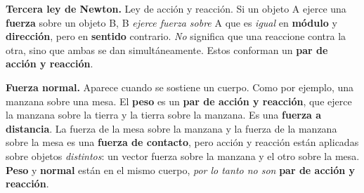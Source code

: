 \documentclass{article}
\begin{document}
\textbf{Tercera ley de Newton.} Ley de acción y reacción. Si un objeto A ejerce 
una \textbf{fuerza} sobre un objeto B, B \textit{ejerce fuerza sobre} A que es 
\textit{igual} en \textbf{módulo} y \textbf{dirección}, pero en \textbf{sentido}
contrario. \textit{No} significa que una reaccione contra la otra, sino que
ambas se dan simultáneamente. 
Estos conforman un \textbf{par de acción y reacción}.

\textbf{Fuerza normal.} Aparece cuando se sostiene un cuerpo. Como por ejemplo,
una manzana sobre una mesa. El \textbf{peso} es un 
\textbf{par de acción y reacción}, que ejerce la manzana sobre la tierra y la 
tierra sobre la manzana. Es una \textbf{fuerza a distancia}. La fuerza de la 
mesa sobre la manzana y la fuerza de la manzana sobre la mesa es una 
\textbf{fuerza de contacto}, pero acción y reacción están aplicadas sobre 
objetos \textit{distintos}: un vector fuerza sobre la manzana y el otro sobre la
mesa. \textbf{Peso} y \textbf{normal} están en el mismo cuerpo, 
\textit{por lo tanto no son} \textbf{par de acción y reacción}.
\end{document}
